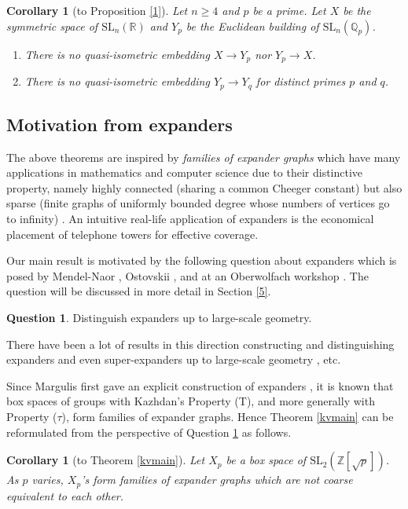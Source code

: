 \documentclass[letterpaper, reqno, 11pt]{amsart}
\newtheorem{corollary}[theorem]{Corollary}
\theoremstyle{definition}
\theoremstyle{definition}
\newtheorem{question}[theorem]{Question}
\theoremstyle{remark}
\begin{document}
\begin{corollary} [to Proposition \ref{1}] \label{sym vs euc}
    Let $n \geq 4$ and $p$ be a prime.
    Let $X$ be the symmetric space of $\mathrm{SL}_n(\mathbb{R})$ and $Y_p$ be the Euclidean building of $\mathrm{SL}_n(\mathbb{Q}_p)$.
    \begin{enumerate}
        \item  There is no quasi-isometric embedding $X \to Y_p$ nor $Y_p \to X$.
        \item There is no quasi-isometric embedding
        $Y_p \to Y_q$ for distinct primes $p$ and $q$.
    \end{enumerate}
\end{corollary}





\subsection{Motivation from expanders}
The above theorems are inspired by \textit{families of expander graphs} which have many applications in mathematics and computer science due to their distinctive property, namely highly connected (sharing a common Cheeger constant) but also sparse (finite graphs of uniformly bounded degree whose numbers of vertices go to infinity) \cite{lubotzky1994discrete, hoory2006expander}. An intuitive real-life application of expanders is the economical placement of telephone towers for effective coverage. 


Our main result is motivated by the following question about expanders which is posed by Mendel-Naor \cite[Section 1.1 and Section 9]{mendel2014nonlinear}, Ostovskii \cite [Theorem 5.76]{ostrovskii2013metric}, and at an Oberwolfach workshop \cite{khukhro2019mini}. The question will be discussed in more detail in Section \ref{5}.
\begin{question}\label{question} 
Distinguish expanders up to large-scale geometry.
\end{question}
There have been a lot of results in this direction constructing and distinguishing expanders and even super-expanders up to large-scale geometry \cite{khukhro2017expanders, das2018geometry, de2019superexpanders,fisher2019rigidity,nowak2017warped,vigolo2019discrete}, etc. 

Since Margulis first gave an explicit construction of expanders \cite{gregory1973margulis}, it is known that box spaces of groups with Kazhdan’s Property (T), and more generally with Property ($\tau$), form families of expander graphs. Hence Theorem \ref{kvmain} can be reformulated from the perspective of Question \ref{question} as follows.
\begin{corollary} [to Theorem \ref{kvmain}] \label{kvmain2}
    Let $X_p$ be a box space of $\mathrm{SL}_2(\mathbb{Z}[\sqrt{p}])$.
    As $p$ varies, $X_p$'s form families of expander graphs which are not coarse equivalent to each other. 
\end{corollary}
\end{document}
